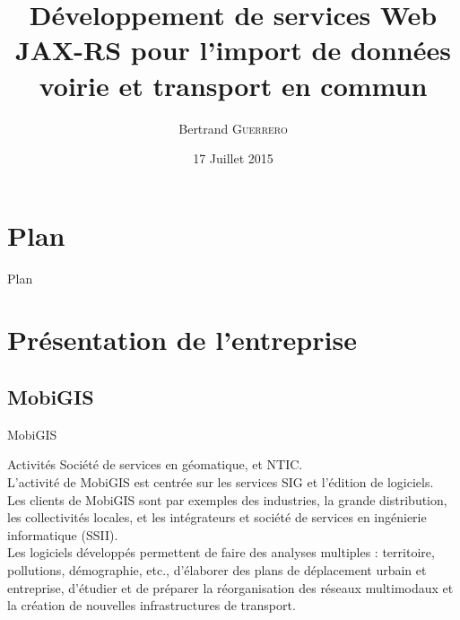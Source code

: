 \documentclass[utf8,compress]{beamer}
\title{Développement de services Web JAX-RS pour l’import de données voirie et transport en commun}
\subtitle{\slidesubject}
\author{Bertrand \textsc{Guerrero}}
\institute{
    Formation professionnelle Concepteur / Développeur \\
    MobiGIS\\
    \vspace{0.8em}
    \emph{- Responsables -} \\
    M.~Christophe \textsc{Lapierre}\\
    M.~Julien \textsc{Lesbegueries}
}
\date{17 Juillet 2015}
\begin{document}
\begin{frame}
\titlepage
\end{frame}


\section{Plan}

\begin{frame}{Plan}
   \begin{multicols}{2}
	\tableofcontents
   \end{multicols}
\end{frame}

\section{Présentation de l’entreprise}
\subsection{MobiGIS}
\begin{frame}{MobiGIS}
\begin{block}{Activités}
Société de services en géomatique, et NTIC.\\	
L’activité de MobiGIS est centrée sur les services SIG et l’édition de logiciels. \\
Les clients de MobiGIS sont par exemples des industries, la grande distribution, les collectivités locales, et
les intégrateurs et société de services en ingénierie informatique (SSII). \\
Les logiciels développés permettent de faire des analyses multiples : territoire, pollutions, démographie, etc., d’élaborer des plans de déplacement
urbain et entreprise, d’étudier et de préparer la réorganisation des réseaux multimodaux et la création de nouvelles infrastructures de transport.
\end{block}
\end{frame}
\end{document}
